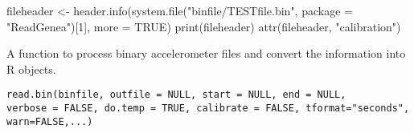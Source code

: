 \documentclass[a4paper]{book}
\begin{document}
%
\begin{Examples}
\begin{ExampleCode}

fileheader <- header.info(system.file("binfile/TESTfile.bin", package = "ReadGenea")[1], more = TRUE)
print(fileheader)
attr(fileheader, "calibration")
\end{ExampleCode}
\end{Examples}
%
\begin{Description}\relax
A function to process binary accelerometer files and convert the information into R objects.
\end{Description}
%
\begin{Usage}
\begin{verbatim}
read.bin(binfile, outfile = NULL, start = NULL, end = NULL, 
verbose = FALSE, do.temp = TRUE, calibrate = FALSE, tformat="seconds", 
warn=FALSE,...)
\end{verbatim}
\end{Usage}
%
\end{document}
